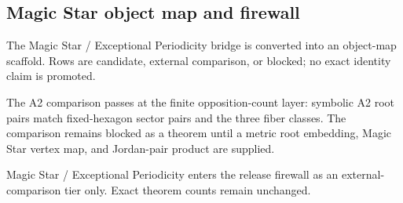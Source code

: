 \subsection{Magic Star object map and firewall}
\label{sec:bt1540-bt1542-magic-star-firewall}

The Magic Star / Exceptional Periodicity bridge is converted into an object-map scaffold.  Rows are candidate, external comparison, or blocked; no exact identity claim is promoted.

The A2 comparison passes at the finite opposition-count layer: symbolic A2 root pairs match fixed-hexagon sector pairs and the three fiber classes.  The comparison remains blocked as a theorem until a metric root embedding, Magic Star vertex map, and Jordan-pair product are supplied.

Magic Star / Exceptional Periodicity enters the release firewall as an external-comparison tier only.  Exact theorem counts remain unchanged.
